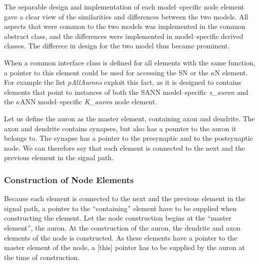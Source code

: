 	The separable design and implementation of each model--specific node element gave a clear view of the similarities and differences between the two models.
	All aspects that were common to the two models was implemented in the common abstract class, and the differences were implemented in model--specific derived classes.
	The differece in design for the two model thus became prominent.


	
	When a common interface class is defined for all elements with the same function, a pointer to this element could be used for accessing the SN or the $\kappa$N element.
	For example the list \emph{pAllAurons} exploit this fact, as it is designed to contains elements that point to instances of both the SANN model--specific \emph{s\_auron} 
		and the $\kappa$ANN model--specific \emph{K\_auron} node element.



	Let us define the auron as the master element, containing axon and dendrite. 
	The axon and dendrite contains synapses, but also has a pounter to the auron it belongs to. The synapse has a pointer to the presynaptic and to the postsynaptic node.
	We can therefore say that each element is connected to the next and the previous element in the signal path.





	\subsubsection{Construction of Node Elements} 
	Because each element is connected to the next and the previous element in the signal path, a pointer to the ``containing'' element have to be supplied when constructing the element.
	Let the node construction begins at the ``master element'', the auron.
	At the construction of the auron, the dendrite and axon elements of the node is constructed.
	As these elements have a pointer to the master element of the node, a [this] pointer has to be supplied by the auron at the time of construction. %

